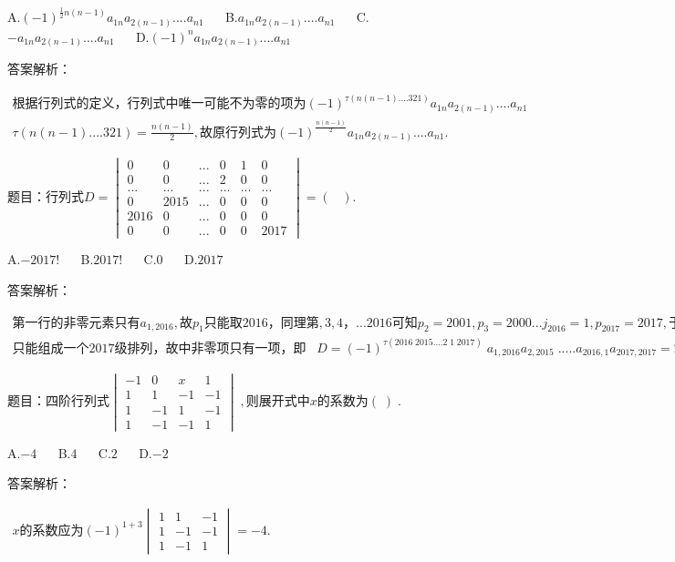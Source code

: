 A.$(-1)^{{\textstyle\frac12}n(n-1)}a_{1n}a_{2(n-1)}....a_{n1}$ $\quad$ B.$a_{1n}a_{2(n-1)}....a_{n1}$ $\quad$ C.$-a_{1n}a_{2(n-1)}....a_{n1}$ $\quad$ D.$(-1)^na_{1n}a_{2(n-1)}....a_{n1}$

答案解析：

$\begin{array}{l}\mathrm{根据行列式的定义}，\mathrm{行列式中唯一可能不为零的项为}(-1)^{\tau(n(n-1)....321)}a_{1n}a_{2(n-1)}....a_{n1}\\\tau(n(n-1)....321)=\frac{n(n-1)}2,\mathrm{故原行列式为}(-1)^\frac{n(n-1)}2a_{1n}a_{2(n-1)}....a_{n1}.\end{array}$



题目：$\mathrm{行列式}D=\begin{vmatrix}0&0&...&0&1&0\\0&0&...&2&0&0\\...&...&...&...&...&...\\0&2015&...&0&0&0\\2016&0&...&0&0&0\\0&0&...&0&0&2017\end{vmatrix}=(\;\;\;).$

A.$-2017!$ $\quad$ B.$2017!$ $\quad$ C.$0$ $\quad$ D.$2017$

答案解析：

$\begin{array}{l}\mathrm{第一行的非零元素只有}a_{1,2016},故p_1\mathrm{只能取}2016，\mathrm{同理第},3,4，...2016\mathrm{可知}p_2=2001,p_3=2000...j_{2016}=1,p_{2017}=2017,\mathrm{于是在可能取的数码中}，\\\mathrm{只能组成一个}2017\mathrm{级排列}，\mathrm{故中非零项只有一项}，即\;\;\;D=(-1)^{\tau(2016\;2015....2\;1\;2017)}\;a_{1,2016}a_{2,2015}\;.....a_{2016,1}a_{2017,2017}=2017!\;.\;\;\;\;\;\end{array}$



题目：$\mathrm{四阶行列式}\begin{vmatrix}-1&0&x&1\\1&1&-1&-1\\1&-1&1&-1\\1&-1&-1&1\end{vmatrix}\;,\mathrm{则展开式中}x\mathrm{的系数为}(\;)\;.$

A.$-4$ $\quad$ B.$4$ $\quad$ C.$2$ $\quad$ D.$-2$

答案解析：

$\begin{array}{l}x\mathrm{的系数应为}(-1)^{1+3}\begin{vmatrix}1&1&-1\\1&-1&-1\\1&-1&1\end{vmatrix}=-4.\\\end{array}$



